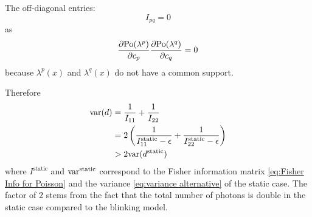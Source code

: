 The off-diagonal entries: 
%
\begin{equation}
	I_{pq}=0
\end{equation}
%
as
% 
\begin{equation}
	\frac{\partial\mathrm{Po}(\lambda^p)}{\partial c_p}\frac{\partial\mathrm{Po}(\lambda^q)}{\partial c_q}=0
\end{equation}
%
because $\lambda^p(x)$ and $\lambda^q(x)$ do not have a common support. 

Therefore
%
\begin{alignat}{1}
	\mathrm{var}(d) & =\frac{1}{I_{11}}+\frac{1}{I_{22}}\nonumber \\
	& =2\left(\frac{1}{I_{11}^{\text{static}}-\epsilon}+\frac{1}{I_{22}^{\text{static}}-\epsilon}\right)\nonumber \\
	& >2\mathrm{var}(d^{\text{static}})\label{eq:variance d static vs blinking}
\end{alignat}
%
where $I^{\text{static}}$ and $\mathrm{var}^{\text{static}}$ correspond to the Fisher information matrix \autoref{eq:Fisher Info for Poisson} and the variance \autoref{eq:variance alternative} of the static case. The factor of 2 stems from the fact that the total number of photons is double in the static case compared to the blinking model. 